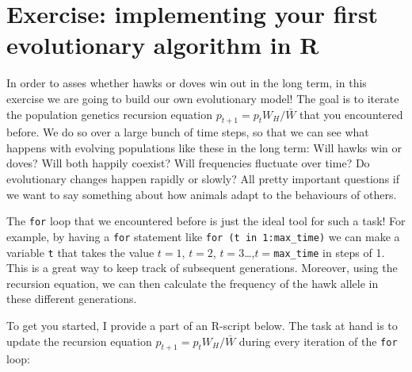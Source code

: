 \documentclass[
]{book}
\begin{document}
\section{Exercise: implementing your first evolutionary algorithm in R}\label{exercise-implementing-your-first-evolutionary-algorithm-in-r}

In order to asses whether hawks or doves win out in the long term, in this exercise we are going to build our own evolutionary model! The goal is to iterate the population genetics recursion equation \(p_{t+1} = p_{t} W_{H} / \bar{W}\) that you encountered before. We do so over a large bunch of time steps, so that we can see what happens with evolving populations like these in the long term: Will hawks win or doves? Will both happily coexist? Will frequencies fluctuate over time? Do evolutionary changes happen rapidly or slowly? All pretty important questions if we want to say something about how animals adapt to the behaviours of others.

The \texttt{for} loop that we encountered before is just the ideal tool for such a task! For example, by having a \texttt{for} statement like \texttt{for\ (t\ in\ 1:max\_time)} we can make a variable \texttt{t} that takes the value \(t=1\), \(t=2\), \(t=3\)\ldots,\(t=\)\texttt{max\_time} in steps of 1. This is a great way to keep track of subsequent generations. Moreover, using the recursion equation, we can then calculate the frequency of the hawk allele in these different generations.

To get you started, I provide a part of an R-script below. The task at hand is to update the recursion equation \(p_{t+1} = p_{t} W_{H} / \bar{W}\) during every iteration of the \texttt{for} loop:
\end{document}
